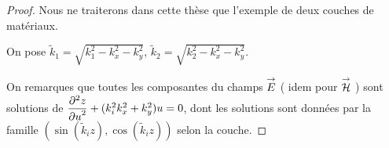     \begin{proof}
      Nous ne traiterons dans cette thèse que l'exemple de deux couches de matériaux.

      \newcommand{\kk}{\tilde{k}}

      On pose \(\kk_1 = \sqrt{k_1^2 - k_x^2 - k_y^2}\),  \(\kk_2 = \sqrt{k_2^2 - k_x^2 - k_y^2}\).

      On remarques que toutes les composantes du champs \(\vE\) ( idem pour \(\vH\) ) sont solutions de \(\ddr[2]{u}{z} + (k_i^2 k_x^2 + k_y^2) u = 0 \), dont les solutions sont données par la famille \((\sin(\kk_i z),\cos(\kk_i z))\) selon la couche.




\end{proof}
